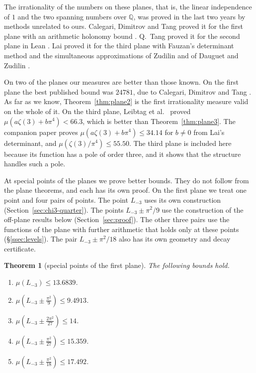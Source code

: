 \documentclass[11pt]{amsart}
\newtheorem{theorem}{Theorem}[section]
\theoremstyle{definition}
\theoremstyle{remark}
\numberwithin{equation}{section}
\newcommand{\Q}{\mathbb Q}
\newcommand{\Lt}{L_{-3}}             %
\newcommand{\MuThirdsU}{9.4913}
\newcommand{\MuChi}{13.6839}
\newcommand{\MuDipA}{14}
\newcommand{\MuDipB}{15.359}
\newcommand{\MuDipC}{17.492}
\begin{document}
The irrationality of the numbers on these planes, that is, the linear independence of $1$ and the two spanning
numbers over $\Q$, was proved in the last two years by methods unrelated to ours. Calegari, Dimitrov and Tang proved
it for the first plane with an arithmetic holonomy bound \cite{CDT2024}. Q.~Tang proved it for the second plane in
Lean \cite{Tang26}. Lai proved it for the third plane with Fauzan's determinant method and the simultaneous
approximations of Zudilin and of Dauguet and Zudilin \cite{Lai2026}.

On two of the planes our measures are better than those known. On the first plane the best published bound was
$24781$, due to Calegari, Dimitrov and Tang \cite{CDT2025}. As far as we know, Theorem~\ref{thm:plane2} is the first
irrationality measure valid on the whole of it. On the third plane, Leibtag et al.\ \cite{LBKWSK26} proved
$\mu(a\zeta(3)+b\pi^4)<66.3$, which is better than Theorem~\ref{thm:plane3}. The companion paper
\cite{Litsey2026d} proves $\mu(a\zeta(3)+b\pi^4)\le34.14$ for $b\ne0$ from Lai's determinant, and
$\mu(\zeta(3)/\pi^4)\le55.50$. The third plane is included here because its
function has a pole of order three, and it shows that the structure handles such a pole.

At special points of the planes we prove better bounds. They do not follow from the plane theorems, and each has its
own proof. On the first plane we treat one point and four pairs of points. The point $\Lt$ uses its own construction
(Section~\ref{sec:chi3-quarter}). The points $\Lt\pm\pi^2/9$ use the construction of the off-plane results below
(Section~\ref{sec:proof}). The other three pairs use the functions of the plane with further arithmetic that holds
only at these points (\S\ref{ssec:levels}). The pair $\Lt\pm\pi^2/18$ also has its own geometry and decay
certificate.

\begin{theorem}[special points of the first plane]\label{thm:points1}
The following bounds hold.
\begin{enumerate}[label=(\roman*),leftmargin=*]
\item $\mu(\Lt)\le\MuChi$.
\item $\mu(\Lt\pm\frac{\pi^2}9)\le\MuThirdsU$.
\item $\mu(\Lt\pm\frac{2\pi^2}{27})\le\MuDipA$.
\item $\mu(\Lt\pm\frac{\pi^2}{27})\le\MuDipB$.
\item $\mu(\Lt\pm\frac{\pi^2}{18})\le\MuDipC$.
\end{enumerate}
\end{theorem}
\end{document}
